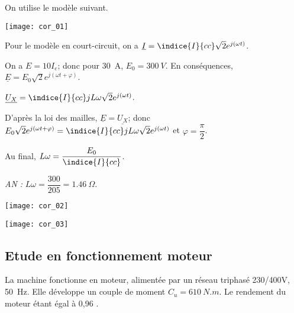 \ifprof
\begin{corrige}
On utilise le modèle suivant. 

\begin{center}
\texttt{[image: cor\_01]}
\end{center}

Pour le modèle en court-circuit, on a $\underline{I}=\indice{I}{cc}\sqrt{2}e^{j\left(\omega t\right)}$.

On a $E = 10 I_e $; donc pour \SI{30}{A}, $E_0=\SI{300}{V}$. En conséquences, $\underline{E}=E_0\sqrt{2}e^{j\left(\omega t + \varphi\right)}$.

$\underline{U_X}=\indice{I}{cc}jL\omega\sqrt{2}e^{j\left(\omega t\right)}$.


D'après la loi des mailles, $\underline{E} = \underline{U_X}$; donc 
$E_0\sqrt{2}e^{j\left(\omega t + \varphi\right)} = \indice{I}{cc}jL\omega\sqrt{2}e^{j\left(\omega t\right)}$ et $\varphi = \dfrac{\pi}{2}$.

Au final, $ L\omega =\dfrac{E_0}{\indice{I}{cc}} $.

\textit{AN :} $ L\omega =\dfrac{300}{205} = \SI{1,46}{\Omega}$.

\end{corrige}
\else
\fi

\ifprof
\begin{marginfigure}
\texttt{[image: cor\_02]}
\end{marginfigure}

\begin{marginfigure}
\texttt{[image: cor\_03]}
\end{marginfigure}

\begin{corrige}


\end{corrige}
\else
\fi

\subsection*{Etude en fonctionnement moteur}

La machine fonctionne en moteur, alimentée par un réseau triphasé 230/400\si{V}, \SI{50}{Hz}. Elle développe un couple de moment $C_u= \SI{610}{N.m}$.
Le rendement du moteur étant égal à 0,96 . 

